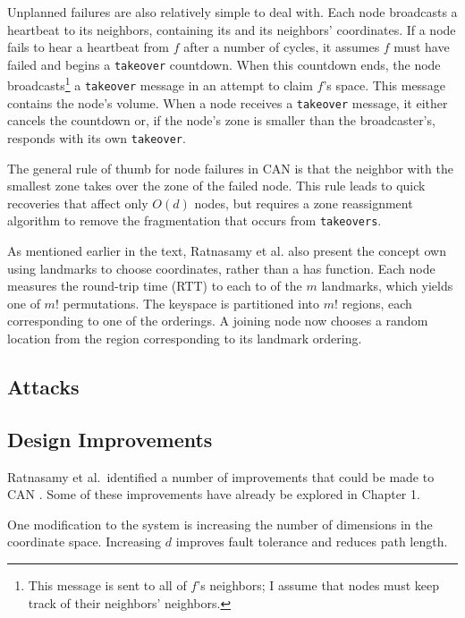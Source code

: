 \documentclass[10pt,letterpaper]{report}
\begin{document}
Unplanned failures are also relatively simple to deal with.
Each node broadcasts a heartbeat to its neighbors, containing its and its neighbors' coordinates.
If a node fails to hear a heartbeat from $f$ after a number of cycles, it assumes $f$ must have failed and begins a \texttt{takeover} countdown.
When this countdown ends, the node broadcasts\footnote{This message is sent to all of $f$'s neighbors;  I assume that nodes must keep track of their neighbors' neighbors.} a \texttt{takeover} message in an attempt to claim $f$'s space.
This message contains the node's volume.
When a node receives a \texttt{takeover} message, it either cancels the countdown or, if the node's zone is smaller than the broadcaster's, responds with its own \texttt{takeover}.

The general rule of thumb for node failures in CAN is that the neighbor with the smallest zone takes over the zone of the failed node.
This rule leads to quick recoveries that affect only $O(d)$ nodes, but requires  a zone reassignment algorithm to remove the fragmentation that occurs from \texttt{takeovers}.

As mentioned earlier in the text, Ratnasamy et al. \cite{can}  also present the concept own using landmarks to choose coordinates, rather than a has function.
Each node measures the round-trip time (RTT) to each to of the $m$ landmarks, which yields one of $m!$ permutations.
The keyspace is partitioned into $m!$ regions, each corresponding to one of the orderings.  
A joining node now chooses a random location from the region corresponding to its landmark ordering.

\subsection*{Attacks}








\subsection*{Design Improvements}
Ratnasamy et al.\ identified a number of improvements that could be made to CAN \cite{can}.
Some of these improvements have already be explored in Chapter 1.

One modification to the system is increasing the number of dimensions in the coordinate space.
Increasing $d$ improves fault tolerance and reduces path length.
\end{document}
